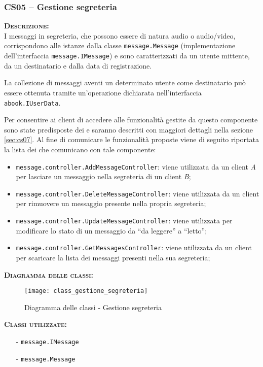 
\subsubsection{CS05 -- Gestione segreteria}\label{sec:cs05}
\begin{description}
	\item{\scshape\bfseries Descrizione:}\\
I messaggi in segreteria, che possono essere di natura audio o audio/video, corrispondono alle istanze dalla classe \texttt{message.Message} (implementazione dell'interfaccia \texttt{message.IMessage}) e sono caratterizzati da un utente mittente, da un destinatario e dalla data di registrazione.

La collezione di messaggi aventi un determinato utente come destinatario può essere ottenuta tramite un'operazione dichiarata nell'interfaccia \texttt{abook.IUserData}.

Per consentire ai client di accedere alle funzionalità gestite da questo componente sono state predisposte dei  e saranno descritti con maggiori dettagli nella sezione \vref{sec:cs07}. Al fine di comunicare le funzionalità proposte viene di seguito riportata la lista dei  che comunicano con tale componente:

\begin{itemize}
	\item \texttt{message.controller.AddMessageController}: viene utilizzata da un client \textit{A} per lasciare un messaggio nella segreteria di un client \textit{B};
	\item \texttt{message.controller.DeleteMessageController}: viene utilizzata da un client per rimuovere un messaggio presente nella propria segreteria;
	\item \texttt{message.controller.UpdateMessageController}: viene utilizzata per modificare lo stato di un messaggio da ``da leggere'' a ``letto'';
	\item \texttt{message.controller.GetMessagesController}: viene utilizzata da un client per scaricare la lista dei messaggi presenti nella sua segreteria;
\end{itemize}

	\item{\scshape\bfseries Diagramma delle classi:}
\begin{figure}[H]
  \centering
  \texttt{[image: class\_gestione\_segreteria]}
  \caption{Diagramma delle classi - Gestione segreteria}\label{fig:gestionesegreteria}
\end{figure}	
	
	\item{\scshape\bfseries Classi utilizzate:}
	\begin{itemize}[noitemsep,nolistsep]
		\item[-] \texttt{message.IMessage}
	  	\item[-] \texttt{message.Message}
	\end{itemize}
\end{description}

